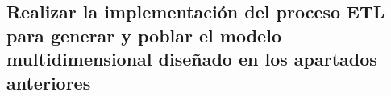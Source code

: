 \medskip
\subsection{Realizar la implementación del proceso ETL para generar y poblar el modelo multidimensional diseñado en los apartados anteriores}
